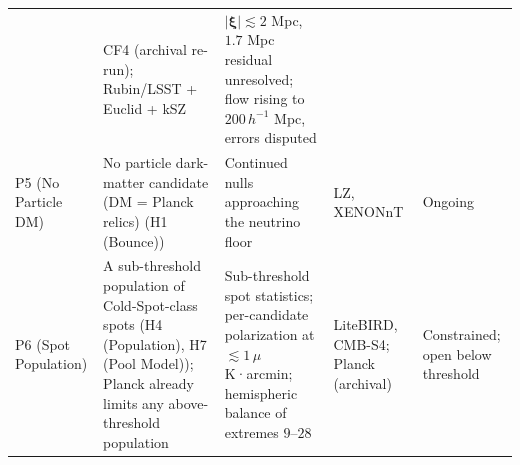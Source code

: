\documentclass[
]{article}
\begin{document}
\begin{longtable}[]{@{}lllll@{}}
\begin{minipage}[t]{0.19\columnwidth}
\end{minipage} & \begin{minipage}[t]{0.19\columnwidth}\raggedright
CF4 (archival re-run); Rubin/LSST + Euclid + kSZ\strut
\end{minipage} & \begin{minipage}[t]{0.19\columnwidth}\raggedright
\(|\boldsymbol{\xi}| \lesssim 2\) Mpc, \(1.7\) Mpc residual unresolved;
flow rising to \(200\,h^{-1}\) Mpc, errors disputed\strut
\end{minipage}\tabularnewline
\begin{minipage}[t]{0.11\columnwidth}\raggedright
P5 (No Particle DM)\strut
\end{minipage} & \begin{minipage}[t]{0.19\columnwidth}\raggedright
No particle dark-matter candidate (DM = Planck relics) (H1
(Bounce))\strut
\end{minipage} & \begin{minipage}[t]{0.19\columnwidth}\raggedright
Continued nulls approaching the neutrino floor\strut
\end{minipage} & \begin{minipage}[t]{0.19\columnwidth}\raggedright
LZ, XENONnT\strut
\end{minipage} & \begin{minipage}[t]{0.19\columnwidth}\raggedright
Ongoing\strut
\end{minipage}\tabularnewline
\begin{minipage}[t]{0.11\columnwidth}\raggedright
P6 (Spot Population)\strut
\end{minipage} & \begin{minipage}[t]{0.19\columnwidth}\raggedright
A sub-threshold population of Cold-Spot-class spots (H4 (Population), H7
(Pool Model)); Planck already limits any above-threshold
population\strut
\end{minipage} & \begin{minipage}[t]{0.19\columnwidth}\raggedright
Sub-threshold spot statistics; per-candidate polarization at
\(\lesssim 1\,\mu\)K·arcmin; hemispheric balance of extremes
\(9\)--\(28\)\strut
\end{minipage} & \begin{minipage}[t]{0.19\columnwidth}\raggedright
LiteBIRD, CMB-S4; Planck (archival)\strut
\end{minipage} & \begin{minipage}[t]{0.19\columnwidth}\raggedright
Constrained; open below threshold\strut
\end{minipage}\tabularnewline

\end{longtable}
\end{document}

